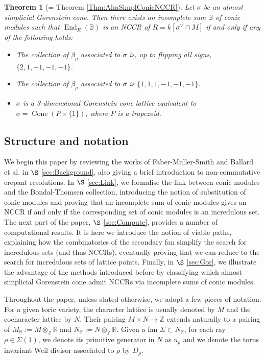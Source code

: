 \documentclass[reqno, 12pt]{amsart}
\newtheorem{theorem}{Theorem}[section]
\theoremstyle{definition}
\numberwithin{equation}{section}
\newcommand{\Z}{\mathbb{Z}}
\newcommand{\R}{\mathbb{R}}
\newcommand{\End}{\operatorname{End}}
\newcommand{\cone}{\operatorname{Cone}}
\begin{document}
\begin{theorem}[= Theorem \ref{Thm:AlmSimplConicNCCR}]
    Let $\sigma$ be an almost simplicial  Gorenstein cone. Then there exists an incomplete sum $\mathbb{B}$ of conic modules such that $\End_{R}(\mathbb{B})$  is an NCCR of $R=k[\sigma^\vee\cap M]$ if and only if any of the following holds:
    \begin{itemize}
        \item The collection of $\beta_\rho$ associated to $\sigma$ is, up to flipping all signs, $\{2,1,-1,-1,-1\}$.
        \item The collection of $\beta_\rho$ associated to $\sigma$ is $\{1,1,1,-1,-1,-1\}$.
        \item $\sigma$ is a 3-dimensional Gorenstein cone lattice equivalent to $\sigma=\cone(P\times\{1\})$, where $P$ is a trapezoid. 
    \end{itemize}
\end{theorem}

\subsection{Structure and notation}

We begin this paper by reviewing the works of Faber-Muller-Smith \cite{FMS19} and Ballard et al. \cite{BBB+} in $\S$ \ref{sec:Background}, also giving a brief introduction to non-commutative crepant resolutions. In $\S$ \ref{sec:Link}, we formalise the link between conic modules and the Bondal-Thomsen collection, introducing the notion of substitution of conic modules and proving that an incomplete sum of conic modules gives an NCCR if and only if the corresponding set of conic modules is an incredulous set. The next part of the paper, $\S$ \ref{sec:Compute}, provides a number of computational results. It is here we introduce the notion of viable paths, explaining how the combinatorics of the secondary fan simplify the search for incredulous sets (and thus NCCRs), eventually proving that we can reduce to the search for incredulous sets of lattice points. Finally, in $\S$ \ref{sec:Gor}, we illustrate the advantage of the methods introduced before by classifying which almost simplicial Gorenstein cone admit NCCRs via incomplete sums of conic modules.

Throughout the paper, unless stated otherwise, we adopt a few pieces of notation. For a given toric variety, the character lattice is usually denoted by $M$ and the cocharacter lattice by $N$. Their pairing $M\times N\rightarrow \Z$ extends naturally to a pairing of $M_\R:=M\otimes_\Z\R$ and $N_\R:=N\otimes_\Z\R$. Given a fan $\Sigma\subset N_\R$, for each ray $\rho\in\Sigma(1)$, we denote its primitive generator in $N$ as $u_\rho$ and we denote the torus invariant Weil divisor associated to $\rho$ by $D_\rho$. 
\end{document}
